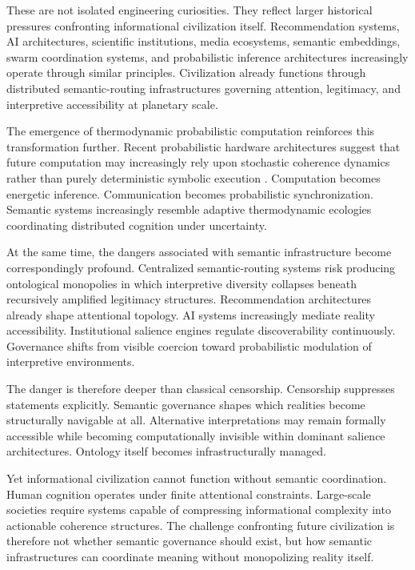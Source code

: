 \documentclass[11pt,a4paper]{article}
\begin{document}
These are not isolated engineering curiosities. They reflect larger historical pressures confronting informational civilization itself. Recommendation systems, AI architectures, scientific institutions, media ecosystems, semantic embeddings, swarm coordination systems, and probabilistic inference architectures increasingly operate through similar principles. Civilization already functions through distributed semantic-routing infrastructures governing attention, legitimacy, and interpretive accessibility at planetary scale.

The emergence of thermodynamic probabilistic computation reinforces this transformation further. Recent probabilistic hardware architectures suggest that future computation may increasingly rely upon stochastic coherence dynamics rather than purely deterministic symbolic execution \cite{jelincic2025}. Computation becomes energetic inference. Communication becomes probabilistic synchronization. Semantic systems increasingly resemble adaptive thermodynamic ecologies coordinating distributed cognition under uncertainty.

At the same time, the dangers associated with semantic infrastructure become correspondingly profound. Centralized semantic-routing systems risk producing ontological monopolies in which interpretive diversity collapses beneath recursively amplified legitimacy structures. Recommendation architectures already shape attentional topology. AI systems increasingly mediate reality accessibility. Institutional salience engines regulate discoverability continuously. Governance shifts from visible coercion toward probabilistic modulation of interpretive environments.

The danger is therefore deeper than classical censorship. Censorship suppresses statements explicitly. Semantic governance shapes which realities become structurally navigable at all. Alternative interpretations may remain formally accessible while becoming computationally invisible within dominant salience architectures. Ontology itself becomes infrastructurally managed.

Yet informational civilization cannot function without semantic coordination. Human cognition operates under finite attentional constraints. Large-scale societies require systems capable of compressing informational complexity into actionable coherence structures. The challenge confronting future civilization is therefore not whether semantic governance should exist, but how semantic infrastructures can coordinate meaning without monopolizing reality itself.
\end{document}

